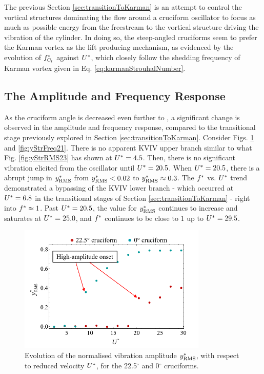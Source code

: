 \documentclass[oneside]{utmthesis}
\begin{document}
\vspace{\baselineskip}

The previous Section \ref{sec:transitionToKarman} is an attempt to control the vortical structures dominating the flow around a cruciform oscillator to focus as much as possible energy from the freestream to the vortical structure driving the vibration of the cylinder. In doing so, the steep-angled cruciforms seem to prefer the Karman vortex as the lift producing mechanism, as evidenced by the evolution of $f_{\text{C}_{l}}^{*}$ against $U^{*}$, which closely follow the shedding frequency of Karman vortex given in Eq. \ref{eq:karmanStrouhalNumber}.

\subsection{The Amplitude and Frequency Response}\label{ssec:kvivAmpFreqResp}

As the cruciform angle is decreased even further to \angtw{}, a significant change is observed in the amplitude and frequency response, compared to the transitional stage previously explored in Section \ref{sec:transitionToKarman}. Consider Figs. \ref{fig:yStrRMS45} and \ref{fig:yStrFreq21}. There is no apparent KVIV upper branch similar to what  Fig. \ref{fig:yStrRMS23} has shown at $U^{*} = 4.5$. Then, there is no significant vibration elicited from the oscillator until $U^{*} = 20.5$. When $U^{*} = 20.5$, there is a abrupt jump in $y^{*}_{\text{RMS}}$ from $y^{*}_{\text{RMS}} < 0.02$ to $y^{*}_{\text{RMS}} \approx 0.3$. The $f^{*}$ vs. $U^{*}$ trend demonstrated a bypassing of the KVIV lower branch - which occurred at $U^{*} = 6.8$ in the transitional stages of Section \ref{sec:transitionToKarman} - right into $f^{*} \approx 1$. Past $U^{*} = 20.5$, the value for $y^{*}_{\text{RMS}}$ continues to increase and saturates at $U^{*} = 25.0$, and $f^{*}$ continues to be close to $1$ up to $U^{*} = 29.5$.

\begin{figure}[H]
  \centering
  \includegraphics[width=0.8\textwidth]{figs/yStrRMS45}
  \caption{Evolution of the normalised vibration amplitude $y^{*}_{\text{RMS}}$, with respect to reduced velocity $U^{*}$, for the 22.5$^{\circ}$ and 0$^{\circ}$ cruciforms.}
  \label{fig:yStrRMS45}
\end{figure}
\end{document}
